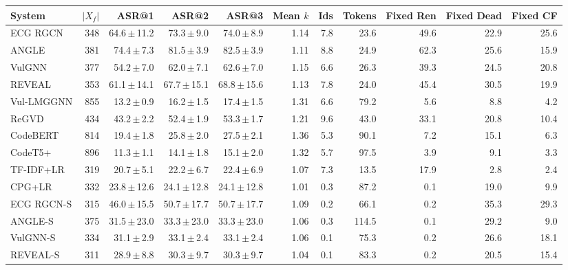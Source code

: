 \begin{tabular}{lrrrrrrrrrr}
\toprule
System & $|X_f|$ & ASR@1 & ASR@2 & ASR@3 & Mean $k$ & Ids & Tokens & Fixed Ren & Fixed Dead & Fixed CF \\
\midrule
ECG RGCN & 348 & 64.6\,$\pm$\,11.2 & 73.3\,$\pm$\,9.0 & 74.0\,$\pm$\,8.9 & 1.14 & 7.8 & 23.6 & 49.6 & 22.9 & 25.6 \\
ANGLE & 381 & 74.4\,$\pm$\,7.3 & 81.5\,$\pm$\,3.9 & 82.5\,$\pm$\,3.9 & 1.11 & 8.8 & 24.9 & 62.3 & 25.6 & 15.9 \\
VulGNN & 377 & 54.2\,$\pm$\,7.0 & 62.0\,$\pm$\,7.1 & 62.6\,$\pm$\,7.0 & 1.15 & 6.6 & 26.3 & 39.3 & 24.5 & 20.8 \\
REVEAL & 353 & 61.1\,$\pm$\,14.1 & 67.7\,$\pm$\,15.1 & 68.8\,$\pm$\,15.6 & 1.13 & 7.8 & 24.0 & 45.4 & 30.5 & 19.9 \\
Vul-LMGGNN & 855 & 13.2\,$\pm$\,0.9 & 16.2\,$\pm$\,1.5 & 17.4\,$\pm$\,1.5 & 1.31 & 6.6 & 79.2 & 5.6 & 8.8 & 4.2 \\
ReGVD & 434 & 43.2\,$\pm$\,2.2 & 52.4\,$\pm$\,1.9 & 53.3\,$\pm$\,1.7 & 1.21 & 9.6 & 43.0 & 33.1 & 20.8 & 10.4 \\
CodeBERT & 814 & 19.4\,$\pm$\,1.8 & 25.8\,$\pm$\,2.0 & 27.5\,$\pm$\,2.1 & 1.36 & 5.3 & 90.1 & 7.2 & 15.1 & 6.3 \\
CodeT5+ & 896 & 11.3\,$\pm$\,1.1 & 14.1\,$\pm$\,1.8 & 15.1\,$\pm$\,2.0 & 1.32 & 5.7 & 97.5 & 3.9 & 9.1 & 3.3 \\
TF-IDF+LR & 319 & 20.7\,$\pm$\,5.1 & 22.2\,$\pm$\,6.7 & 22.4\,$\pm$\,6.9 & 1.07 & 7.3 & 13.5 & 17.9 & 2.8 & 2.4 \\
CPG+LR & 332 & 23.8\,$\pm$\,12.6 & 24.1\,$\pm$\,12.8 & 24.1\,$\pm$\,12.8 & 1.01 & 0.3 & 87.2 & 0.1 & 19.0 & 9.9 \\
ECG RGCN-S & 315 & 46.0\,$\pm$\,15.5 & 50.7\,$\pm$\,17.7 & 50.7\,$\pm$\,17.7 & 1.09 & 0.2 & 66.1 & 0.2 & 35.3 & 29.3 \\
ANGLE-S & 375 & 31.5\,$\pm$\,23.0 & 33.3\,$\pm$\,23.0 & 33.3\,$\pm$\,23.0 & 1.06 & 0.3 & 114.5 & 0.1 & 29.2 & 9.0 \\
VulGNN-S & 334 & 31.1\,$\pm$\,2.9 & 33.1\,$\pm$\,2.4 & 33.1\,$\pm$\,2.4 & 1.06 & 0.1 & 75.3 & 0.2 & 26.6 & 18.1 \\
REVEAL-S & 311 & 28.9\,$\pm$\,8.8 & 30.3\,$\pm$\,9.7 & 30.3\,$\pm$\,9.7 & 1.04 & 0.1 & 83.3 & 0.2 & 20.5 & 15.4 \\
\bottomrule
\end{tabular}
